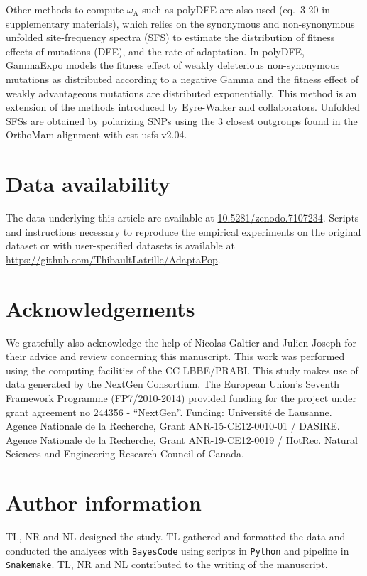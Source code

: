 \documentclass{article}
\newcommand{\rateApop}{\omega_{\mathrm{A}}}
\begin{document}
    Other methods to compute $\rateApop$ such as polyDFE\cite{tataru_polydfe_2020} are also used (eq.~3-20 in supplementary materials), which relies on the synonymous and non-synonymous unfolded site-frequency spectra (SFS) to estimate the distribution of fitness effects of mutations (DFE), and the rate of adaptation.
    In polyDFE, GammaExpo models the fitness effect of weakly deleterious non-synonymous mutations as distributed according to a negative Gamma and the fitness effect of weakly advantageous mutations are distributed exponentially.
    This method is an extension of the methods introduced by Eyre-Walker and collaborators\cite{eyre-walker_distribution_2006, eyre-walker_estimating_2009}.
    Unfolded SFSs are obtained by polarizing SNPs using the $3$ closest outgroups found in the OrthoMam alignment with est-usfs v2.04\cite{keightley_inferring_2018}.

    \section{Data availability}\label{sec:data-availability}
    The data underlying this article are available at \url{10.5281/zenodo.7107234}.
    Scripts and instructions necessary to reproduce the empirical experiments on the original dataset or with user-specified datasets is available at \url{https://github.com/ThibaultLatrille/AdaptaPop}.

    \section{Acknowledgements}\label{sec:acknowledgements}
    We gratefully also acknowledge the help of Nicolas Galtier and Julien Joseph for their advice and review concerning this manuscript.
    This work was performed using the computing facilities of the CC LBBE/PRABI.
    This study makes use of data generated by the NextGen Consortium.
    The European Union’s Seventh Framework Programme (FP7/2010-2014) provided funding for the project under grant agreement no 244356 - “NextGen”.
    Funding: Université de Lausanne.
    Agence Nationale de la Recherche, Grant ANR-15-CE12-0010-01 / DASIRE.
    Agence Nationale de la Recherche, Grant ANR-19-CE12-0019 / HotRec.
    Natural Sciences and Engineering Research Council of Canada.

    \section{Author information}\label{sec:author-information}
    TL, NR and NL designed the study.
    TL gathered and formatted the data and conducted the analyses with \texttt{BayesCode} using scripts in \texttt{Python} and pipeline in \texttt{Snakemake}.
    TL, NR and NL contributed to the writing of the manuscript.
\end{document}
